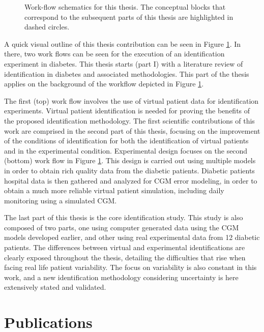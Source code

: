 \begin{figure}[hbtp]
\centering
{}\caption{Work-flow schematics for this thesis. The conceptual blocks that correspond to the subsequent parts of this thesis are highlighted in dashed circles.}
\label{fig:thesis_outline}
\end{figure}

A quick visual outline of this thesis contribution can be seen in Figure \ref{fig:thesis_outline}. In there, two work flows can be seen for the execution of an identification experiment in diabetes. This thesis starts (part I) with a literature review of identification in diabetes and associated methodologies. This part of the thesis applies on the background of the workflow depicted in Figure \ref{fig:thesis_outline}.

The first (top) work flow involves the use of virtual patient data for identification experiments. Virtual patient identification is needed for proving the benefits of the proposed identification methodology. The first scientific contributions of this work are comprised in the second part of this thesis, focusing on the improvement of the conditions of identification for both the identification of virtual patients and in the experimental condition. Experimental design focuses on the second (bottom) work flow in Figure \ref{fig:thesis_outline}. This design is carried out using multiple models in order to obtain rich quality data from the diabetic patients. Diabetic patients hospital data is then gathered and analyzed for CGM error modeling, in order to obtain a much more reliable virtual patient simulation, including daily monitoring using a simulated CGM. 

The last part of this thesis is the core identification study. This study is also composed of two parts, one using computer generated data using the CGM models developed earlier, and other using real experimental data from 12 diabetic patients. The differences between virtual and experimental identifications are clearly exposed throughout the thesis, detailing the difficulties that rise when facing real life patient variability. The focus on variability is also constant in this work, and a new identification methodology considering uncertainty is here extensively stated and validated.

\section*{Publications}
\label{sec:Publications}

